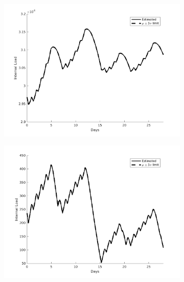 \begin{figure}[H]
\begin{subfigure}{0.45\textwidth}
\centering
\includegraphics[width=\textwidth]{jbs_figures/load_1_2}
\caption{}
\label{load_1_2}
\end{subfigure}
\centering
\begin{subfigure}{0.45\textwidth}
\includegraphics[width=\textwidth]{jbs_figures/load_2_2}
\caption{}
\label{load_2_2}
\end{subfigure} \\
\begin{subfigure}{0.45\textwidth}
\centering

\end{subfigure}
\end{figure}
